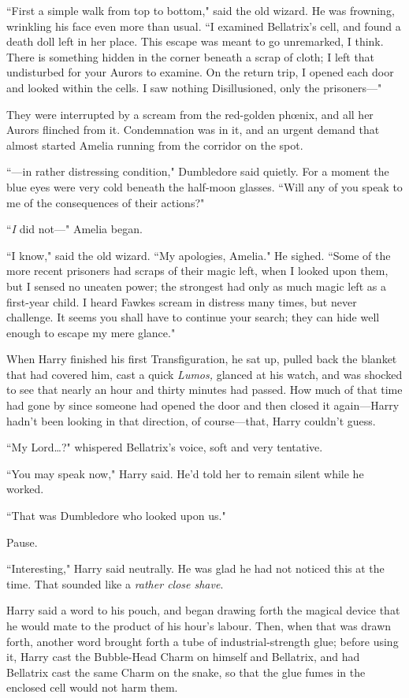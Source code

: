 ``First a simple walk from top to bottom," said the old wizard. He was frowning, wrinkling his face even more than usual. ``I examined Bellatrix's cell, and found a death doll left in her place. This escape was meant to go unremarked, I think. There is something hidden in the corner beneath a scrap of cloth; I left that undisturbed for your Aurors to examine. On the return trip, I opened each door and looked within the cells. I saw nothing Disillusioned, only the prisoners—"

They were interrupted by a scream from the red-golden phœnix, and all her Aurors flinched from it. Condemnation was in it, and an urgent demand that almost started Amelia running from the corridor on the spot.

``—in rather distressing condition," Dumbledore said quietly. For a moment the blue eyes were very cold beneath the half-moon glasses. ``Will any of you speak to me of the consequences of their actions?"

``\emph{I} did not—" Amelia began.

``I know," said the old wizard. ``My apologies, Amelia." He sighed. ``Some of the more recent prisoners had scraps of their magic left, when I looked upon them, but I sensed no uneaten power; the strongest had only as much magic left as a first-year child. I heard Fawkes scream in distress many times, but never challenge. It seems you shall have to continue your search; they can hide well enough to escape my mere glance."

\later

When Harry finished his first Transfiguration, he sat up, pulled back the blanket that had covered him, cast a quick \emph{Lumos,} glanced at his watch, and was shocked to see that nearly an hour and thirty minutes had passed. How much of that time had gone by since someone had opened the door and then closed it again—Harry hadn't been looking in that direction, of course—that, Harry couldn't guess.

``My Lord{\ldots}?" whispered Bellatrix's voice, soft and very tentative.

``You may speak now," Harry said. He'd told her to remain silent while he worked.

``That was Dumbledore who looked upon us."

Pause.

``Interesting," Harry said neutrally. He was glad he had not noticed this at the time. That sounded like a \emph{rather close shave}.

Harry said a word to his pouch, and began drawing forth the magical device that he would mate to the product of his hour's labour. Then, when that was drawn forth, another word brought forth a tube of industrial-strength glue; before using it, Harry cast the Bubble-Head Charm on himself and Bellatrix, and had Bellatrix cast the same Charm on the snake, so that the glue fumes in the enclosed cell would not harm them.

